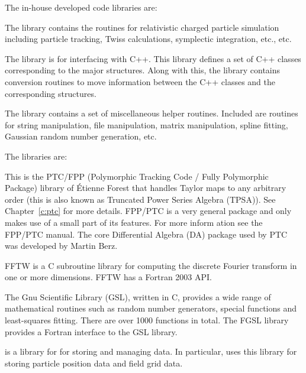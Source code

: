 {{{{{{The in-house developed code libraries are:
\begin{description}
  \item[bmad] \Newline
The  library contains the routines for relativistic charged
particle simulation including particle tracking, Twiss calculations,
symplectic integration, etc., etc.
  \item[cpp_bmad_interface]
The  library is for interfacing \bmad with C++.  This library
defines a set of C++ classes corresponding to the major \bmad structures. Along
with this, the library contains conversion routines to move information between 
the C++ classes and the corresponding \bmad structures.
  \item[sim_utils] \Newline
The  library contains a set of miscellaneous helper routines. 
Included are routines for string manipulation, file manipulation,
matrix manipulation, spline fitting, Gaussian random number generation, etc. 
\end{description}
%  
The  libraries are:
\begin{description}
  \item[forest] \Newline
This is the PTC/FPP (Polymorphic Tracking Code / Fully Polymorphic
Package) library of \'Etienne Forest that handles Taylor maps to any
arbitrary order (this is also known as Truncated Power Series Algebra
(TPSA)). See Chapter~\ref{c:ptc} for more details.  FPP/PTC is a
very general package and \bmad only makes use of a small part of its
features.  For more inform
ation see the FPP/PTC
manual\cite{b:ptc}. The core Differential Algebra (DA) package used
by PTC was developed by Martin Berz\cite{b:berz}.
%
  \item[fftw] \Newline
FFTW is a C subroutine library for computing the discrete Fourier
transform in one or more dimensions. FFTW has a Fortran 2003 API.
%
  \item[gsl / fgsl] \Newline
The Gnu Scientific Library (GSL), written in C, provides a wide range of mathematical
routines such as random number generators, special functions and least-squares
fitting. There are over 1000 functions in total. The FGSL library provides a Fortran
interface to the GSL library.
%
  \item[hdf5] \Newline
{} is a library for for storing and managing data\cite{b:hdf5}. In particular, \bmad uses
this library for storing particle position data and field grid data.

\end{description}}}}}}}
